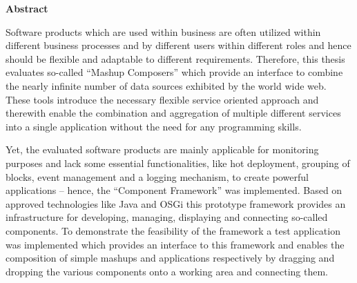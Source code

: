 \thispagestyle{empty}
\begin{center}
\huge \textbf{Abstract}
\end{center}
\vskip 2cm

\noindent Software products which are used within business are often utilized within different
business processes and by different users within different roles and hence should be flexible and
adaptable to different requirements. Therefore, this thesis evaluates so-called ``Mashup Composers''
which provide an interface to combine the nearly infinite number of data sources exhibited by the
world wide web. These tools introduce the necessary flexible service oriented approach and therewith
enable the combination and aggregation of multiple different services into a single application
without the need for any programming skills.

Yet, the evaluated software products are mainly applicable for monitoring purposes and lack some
essential functionalities, like hot deployment, grouping of blocks, event management and a logging
mechanism, to create powerful applications -- hence, the ``Component Framework'' was implemented.
Based on approved technologies like Java and OSGi this prototype framework provides an infrastructure
for developing, managing, displaying and connecting so-called components. To demonstrate the
feasibility of the framework a test application was implemented which provides an interface to this
framework and enables the composition of simple mashups and applications respectively by dragging and
dropping the various components onto a working area and connecting them.

\cleardoublepage